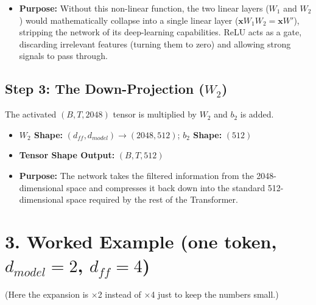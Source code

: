 \documentclass[11pt,a4paper,oneside]{report}
\providecommand{\tightlist}{\setlength{\itemsep}{0pt}\setlength{\parskip}{0pt}}
\begin{document}
\begin{itemize}
\tightlist
\item
  \textbf{Purpose:} Without this non-linear function, the two linear layers (\(W_1\) and \(W_2\)) would mathematically collapse into a single linear layer (\(\mathbf{x} W_1 W_2 = \mathbf{x} W'\)), stripping the network of its deep-learning capabilities. ReLU acts as a gate, discarding irrelevant features (turning them to zero) and allowing strong signals to pass through.
\end{itemize}

\subsection{\texorpdfstring{Step 3: The Down-Projection (\(W_2\))}{Step 3: The Down-Projection (W\_2)}}\label{step-3-the-down-projection-w_2}

The activated \((B, T, 2048)\) tensor is multiplied by \(W_2\) and \(b_2\) is added.

\begin{itemize}
\tightlist
\item
  \textbf{\(W_2\) Shape:} \((d_{ff}, d_{model}) \rightarrow (2048, 512)\); \textbf{\(b_2\) Shape:} \((512)\)
\item
  \textbf{Tensor Shape Output:} \((B, T, 512)\)
\item
  \textbf{Purpose:} The network takes the filtered information from the 2048-dimensional space and compresses it back down into the standard 512-dimensional space required by the rest of the Transformer.
\end{itemize}

\section{\texorpdfstring{3. Worked Example (one token, \(d_{model} = 2\), \(d_{ff} = 4\))}{3. Worked Example (one token, d\_\{model\} = 2, d\_\{ff\} = 4)}}\label{3-worked-example-one-token-d_model--2-d_ff--4}

(Here the expansion is ×2 instead of ×4 just to keep the numbers small.)

\begin{center}\end{center}
\end{document}
